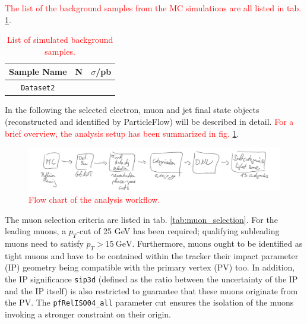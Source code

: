 \textcolor{red}{The list of the background samples from the MC simulations are all listed in tab. \ref{tab:bkg_datasets}}.

\begin{table}[h!]
	\centering
	\begin{tabular}{ccc}
		Sample Name & N & $\sigma$/pb \\
		\hline
		\texttt{Dataset2} & & \\
	\end{tabular}
	\caption{\textcolor{red}{List of simulated background samples.}}
	\label{tab:bkg_datasets}
\end{table}


In the following the selected electron, muon and jet final state objects (reconstructed and identified by ParticleFlow) will be described in detail. \textcolor{red}{For a brief overview, the analysis setup has been summarized in fig. \ref{fig:analysis_workflow}}.

\begin{figure}[h!]
	\centering
	\includegraphics[width=\linewidth]{figures/analysis/classification.pdf}
	\caption{\textcolor{red}{Flow chart of the analysis workflow.}}
	\label{fig:analysis_workflow}
\end{figure}

The muon selection criteria are listed in tab. \ref{tab:muon_selection}. For the leading muons, a $p_T$-cut of 25 GeV has been required; qualifying subleading muons need to satisfy $p_T>\SI{15}{\giga\electronvolt}$. Furthermore, muons ought to be identified as tight muons and have to be contained within the tracker their impact parameter (IP) geometry being compatible with the primary vertex (PV) too. In addition, the IP significance \texttt{sip3d} (defined as the ratio between the uncertainty of the IP and the IP itself) is also restricted to guarantee that these muons originate from the PV. The \texttt{pfRelISO04\_all} parameter cut ensures the isolation of the muons invoking a stronger constraint on their origin.

